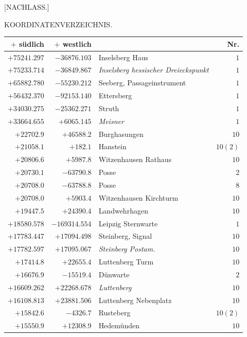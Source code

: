 \clearpage{}%
\begin{center}[NACHLASS.]\par\bigskip KOORDINATENVERZEICHNIS.\end{center}
\begin{center}\begingroup\fontsize{8}{9}\selectfont
\setlength{\tabcolsep}{4pt}
\begin{tabular}{r|r|p{170pt}|r}\hline
\(+\) südlich&\(+\) westlich&&Nr.\\\hline
\(+75241.297\)&\(-36876.103\)&Inselsberg Haus&\(1\)\\
\(+75233.714\)&\(-36849.867\)&\textit{Inselsberg hessischer Dreieckspunkt}&\(1\)\\
\(+65882.780\)&\(-55230.212\)&Seeberg, Passageinstrument&\(1\)\\
\(+56432.370\)&\(-92153.140\)&Ettersberg&\(1\)\\
\(+34030.275\)&\(-25362.271\)&Struth&\(1\)\\
\(+33664.655\)&\(+6065.145\)&\textit{Meisner}&\(1\)\\
\(+22702.9\)&\(+46588.2\)&Burghasungen&\(10\)\\
\(+21058.1\)&\(+182.1\)&Hanstein&\(10(2)\)\\
\(+20806.6\)&\(+5987.8\)&Witzenhausen Rathaus&\(10\)\\
\(+20730.1\)&\(-63790.8\)&Posse&\(2\)\\
\(+20708.0\)&\(-63788.8\)&Posse&\(8\)\\
\(+20708.0\)&\(+5903.4\)&Witzenhausen Kirchturm&\(10\)\\
\(+19447.5\)&\(+24390.4\)&Landwehrhagen&\(10\)\\
\(+18580.578\)&\(-169314.554\)&Leipzig Sternwarte&\(1\)\\
\(+17783.447\)&\(+17094.498\)&Steinberg, Signal&\(10\)\\
\(+17782.597\)&\(+17095.067\)&\textit{Steinberg Postam.}&\(10\)\\
\(+17414.8\)&\(+22655.4\)&Luttenberg Turm&\(10\)\\
\(+16676.9\)&\(-15519.4\)&Dünwarte&\(2\)\\
\(+16609.262\)&\(+22268.678\)&\textit{Luttenberg}&\(10\)\\
\(+16108.813\)&\(+23881.506\)&Luttenberg Nebenplatz&\(10\)\\
\(+15842.6\)&\(-4326.7\)&Rusteberg&\(10(2)\)\\
\(+15550.9\)&\(+12308.9\)&Hedemünden&\(10\)\\

\end{tabular}
\end{center}
